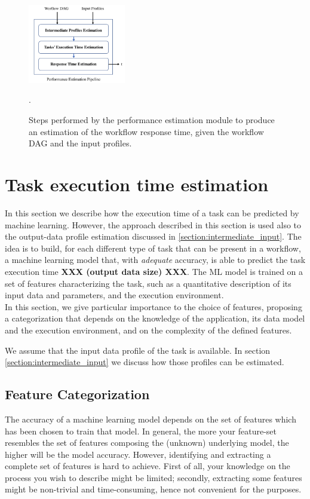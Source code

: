 \documentclass[a4paper, 10pt, conference]{ieeeconf}      %
\begin{document}
\begin{figure}
  \centering
  \includegraphics[width=0.38\textwidth]{sources/perf-estimation-module.png}
  \caption{Steps performed by the performance estimation module to produce an estimation of the workflow response time, given the workflow DAG and the input profiles.}.
\label{fig:module}
\end{figure}

\section{Task execution time estimation}
\label{section:task_modeling}
In this section we describe how the execution time of a task can be predicted by machine learning. However, the approach described in this section is used also to the output-data profile estimation discussed in \ref{section:intermediate_input}. 
The idea is to build, for each different type of task that can be present in a workflow, a machine learning model that, with \textit{adequate} accuracy, is able to predict the task execution time \textbf{XXX (output data size) XXX}. The ML model is trained on a set of features characterizing the task, such as a quantitative description of its input data and parameters, and the execution environment. \\
In this section, we give particular importance to the choice  of features, proposing a categorization that depends on the knowledge of the application, its data model and the execution environment, and on the complexity of the defined features.

We assume that the input data profile of the task is available. In section \ref{section:intermediate_input} we discuss how those profiles can be estimated.        


\subsection{Feature Categorization}
\label{subsec:feature-set}
The accuracy of a machine learning model depends on the set of features which has been chosen to train that model. In general, the more your feature-set resembles the set of features composing the (unknown) underlying model, the higher will be the model accuracy. 
However, identifying and extracting a complete set of features is hard to achieve. First of all, your knowledge on the process you wish to describe might be limited; secondly, extracting some features might be non-trivial and time-consuming, hence not convenient for the purposes. 
\end{document}
